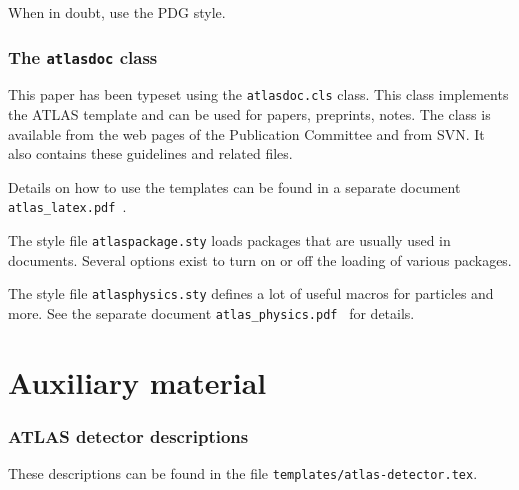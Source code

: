 \documentclass[PAPER,UKenglish,texlive=2014]{latex/atlasdoc}
\newcommand{\File}[1]{\texttt{#1}\xspace}
\begin{document}
When in doubt, use the PDG style.


\section{The \texttt{atlasdoc} class}
\label{sec:atlasdoc}

This paper has been typeset using the \texttt{atlasdoc.cls} class.
This class implements the ATLAS template and can be used for papers, preprints,
notes. The class is available from the web pages of the
Publication Committee and from SVN.
It also contains these guidelines and related files.

Details on how to use the templates can be found in a separate document
\texttt{atlas\_latex.pdf}~\cite{atlas-latex}.

The style file \File{atlaspackage.sty} loads packages that are usually used in documents.
Several options exist to turn on or off the loading of various packages.

The style file \texttt{atlasphysics.sty} defines a lot of useful
macros for particles and more. See the separate document
\texttt{atlas\_physics.pdf}~\cite{atlas-physics} for details.


\printbibliography
% 
% 


\clearpage
\appendix
\part*{Auxiliary material}


\section{ATLAS detector descriptions}
\label{app:atlasdet}

These descriptions can be found in the file \File{templates/atlas-detector.tex}.


\end{document}
